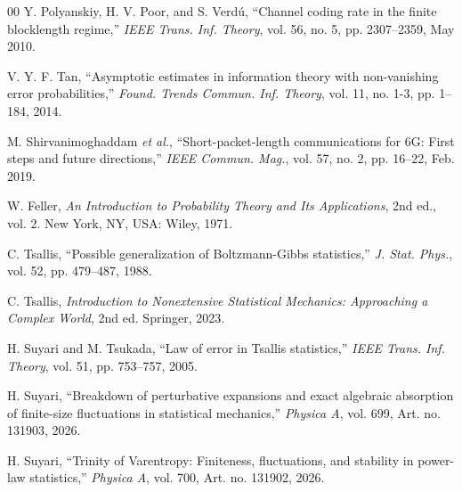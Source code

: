 \documentclass[conference]{IEEEtran}
\begin{document}

\begin{thebibliography}{00}
Y. Polyanskiy, H. V. Poor, and S. Verdú, ``Channel coding rate in the finite blocklength regime,'' \textit{IEEE Trans. Inf. Theory}, vol. 56, no. 5, pp. 2307--2359, May 2010.

V. Y. F. Tan, ``Asymptotic estimates in information theory with non-vanishing error probabilities,'' \textit{Found. Trends Commun. Inf. Theory}, vol. 11, no. 1-3, pp. 1--184, 2014.

M. Shirvanimoghaddam \textit{et al.}, ``Short-packet-length communications for 6G: First steps and future directions,'' \textit{IEEE Commun. Mag.}, vol. 57, no. 2, pp. 16--22, Feb. 2019.

W. Feller, \textit{An Introduction to Probability Theory and Its Applications}, 2nd ed., vol. 2. New York, NY, USA: Wiley, 1971.

C. Tsallis, ``Possible generalization of Boltzmann-Gibbs statistics,'' \textit{J. Stat. Phys.}, vol. 52, pp. 479--487, 1988.

C. Tsallis, \textit{Introduction to Nonextensive Statistical Mechanics: Approaching a Complex World}, 2nd ed. Springer, 2023.

H. Suyari and M. Tsukada, ``Law of error in Tsallis statistics,'' \textit{IEEE Trans. Inf. Theory}, vol. 51, pp. 753--757, 2005.

H. Suyari, ``Breakdown of perturbative expansions and exact algebraic absorption of finite-size fluctuations in statistical mechanics,'' \textit{Physica A}, vol. 699, Art. no. 131903, 2026.

H. Suyari, ``Trinity of Varentropy: Finiteness, fluctuations, and stability in power-law statistics,'' \textit{Physica A}, vol. 700, Art. no. 131902, 2026. 

\end{thebibliography}
\end{document}
